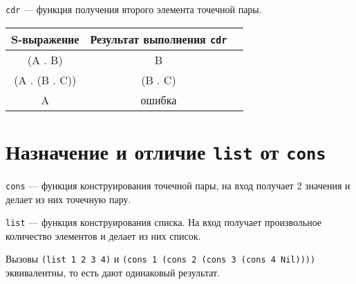 \texttt{cdr} --- функция получения второго элемента точечной пары.

\begin{table}[!ht]
    \small
	\begin{center}
		\begin{tabular}{|c|c|c|}
            \hline
            \bfseries S-выражение & \bfseries Результат выполнения \texttt{cdr} \\\hline
            (A . B) & B \\ \hline
            (A . (B . C)) & (B . C) \\\hline
            A & ошибка \\\hline
		\end{tabular}
	\end{center}
\end{table}

\section{Назначение и отличие \texttt{list} от \texttt{cons}}

\texttt{cons} --- функция конструирования точечной пары, на вход получает 2 значения и делает из них точечную пару.

\texttt{list} --- функция конструирования списка. На вход получает произвольное количество элементов и делает из них список.

Вызовы \texttt{(list 1 2 3 4)} и \texttt{(cons 1 (cons 2 (cons 3 (cons 4 Nil))))} эквивалентны, то есть дают одинаковый результат.
